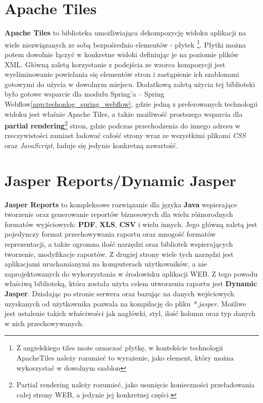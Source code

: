 \section{Apache Tiles}\label{tech:tiles}
	\textbf{Apache Tiles} to biblioteka umożliwiająca dekompozycję widoku aplikacji na wiele niezwiązanych ze sobą bezpośrednio elementów - płytek \footnote{Z angielskiego tiles może oznaczać płytkę, w kontekście technologii ApacheTiles należy rozumieć to wyrażenie, jako element, który można wykorzystać w dowolnym szablon}. Płytki można potem dowolnie łączyć w konkretne widoki definiując je na poziomie plików XML. Główną zaletą korzystanie z podejścia ze wzorca kompozycji jest wyeliminowanie powielania się elementów stron i zastąpienie ich szablonami gotowymi do użycia w dowolnym miejscu. Dodatkową zaletą użycia tej biblioteki było gotowe wsparcie dla modułu Spring’a – Spring Webflow\ref{app:techonlog_spring_webflow}, gdzie jedną z preferowanych technologii widoku jest właśnie Apache Tiles, a także możliwość prostszego wsparcia dla \textbf{partial rendering}\footnote{Partial rendering należy rozumieć, jako usunięcie konieczności przeładowania całej strony WEB, a jedynie jej konkretnej części.} stron, gdzie podczas przechodzenia do innego adresu w rzeczywistości zamiast ładować całość strony wraz ze wszystkimi plikami \textit{CSS} oraz \textit{JavaScript}, ładuje się jedynie konkretną zawartość.
	
\section{Jasper Reports/Dynamic Jasper}\label{tech:jasperReports}
	\textbf{Jasper Reports} to kompleksowe rozwiązanie dla języka \textbf{Java} wspierające tworzenie oraz generowanie reportów biznesowych dla wielu różnorodnych formatów wyjściowych: \textbf{PDF}, \textbf{XLS}, \textbf{CSV} i wielu innych. Jego główną zaletą jest pojedynczy format przechowywania raportu oraz mnogość formatów reprezentacji, a także ogromna ilość  narzędzi oraz bibliotek wspierających tworzenie, modyfikacje raportów. 
	Z drugiej strony wiele tych narzędzi jest aplikacjami uruchamianymi na komputerach użytkowników, a nie zaprojektowanych do wykorzystania w środowisku aplikacji WEB. Z tego powodu właściwą biblioteką, która została użyta celem utworzenia raportu jest \textbf{Dynamic Jasper}. Działając po stronie serwera oraz bazując na danych wejściowych uzyskanych od użytkownika pozwala na kompilację do pliku \textit{*.jasper}. Możliwe jest ustalenie takich właściwości jak nagłówki, styl, ilość kolumn oraz typ danych w nich przechowywanych.

